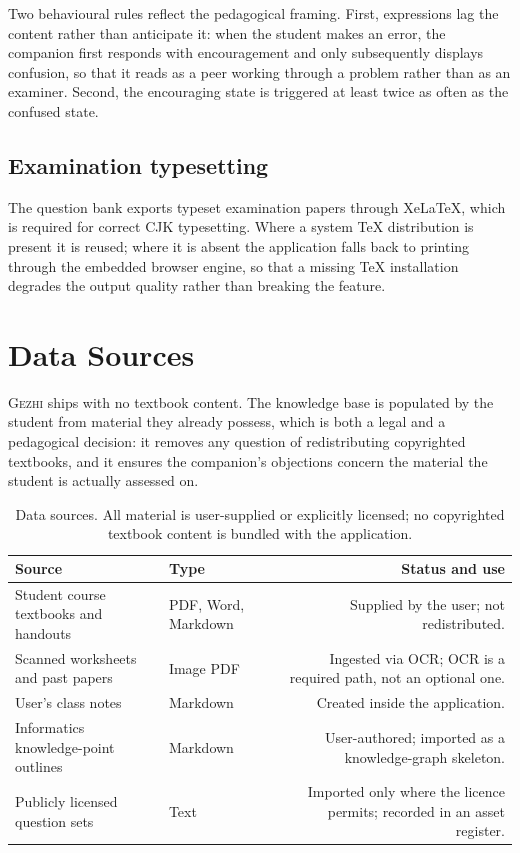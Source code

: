 \documentclass[11pt,a4paper]{article}
\newcommand{\gezhi}{\textsc{Gezhi}}
\begin{document}
Two behavioural rules reflect the pedagogical framing. First, expressions lag the content
rather than anticipate it: when the student makes an error, the companion first responds
with encouragement and only subsequently displays confusion, so that it reads as a peer
working through a problem rather than as an examiner. Second, the encouraging state is
triggered at least twice as often as the confused state.

\subsection{Examination typesetting}

The question bank exports typeset examination papers through XeLaTeX, which is required for
correct CJK typesetting. Where a system TeX distribution is present it is reused; where it
is absent the application falls back to printing through the embedded browser engine, so
that a missing TeX installation degrades the output quality rather than breaking the
feature.

\section{Data Sources}

\gezhi{} ships with no textbook content. The knowledge base is populated by the student from
material they already possess, which is both a legal and a pedagogical decision: it removes
any question of redistributing copyrighted textbooks, and it ensures the companion's
objections concern the material the student is actually assessed on.

\begin{table}[h]
\centering
\small
\begin{tabularx}{\textwidth}{@{}p{4.4cm} p{3.6cm} R@{}}
\toprule
\textbf{Source} & \textbf{Type} & \textbf{Status and use} \\
\midrule
Student course textbooks and handouts & PDF, Word, Markdown & Supplied by the user; not redistributed. \\
Scanned worksheets and past papers & Image PDF & Ingested via OCR; OCR is a required path, not an optional one. \\
User's class notes & Markdown & Created inside the application. \\
Informatics knowledge-point outlines & Markdown & User-authored; imported as a knowledge-graph skeleton. \\
Publicly licensed question sets & Text & Imported only where the licence permits; recorded in an asset register. \\
\bottomrule
\end{tabularx}
\caption{Data sources. All material is user-supplied or explicitly licensed; no copyrighted
textbook content is bundled with the application.}
\label{tab:data}
\end{table}
\end{document}
